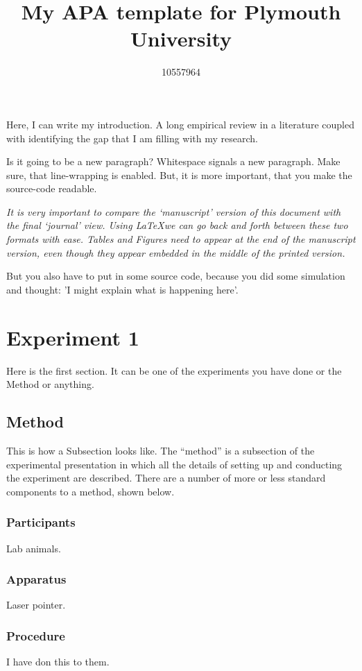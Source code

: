 \documentclass[jou]{apa6} %
\title{My APA template for Plymouth University}
\author{10557964}
\affiliation{School of Psychology \\ Plymouth University}
\begin{document}
\maketitle

Here, I can write my introduction. A long empirical review in a literature coupled with identifying the gap that I am filling with my research.

Is it going to be a new paragraph?
Whitespace signals a new paragraph. Make sure, that line-wrapping is enabled. But,
it is more important, that you make the source-code readable.

\emph{It is very important to compare the `manuscript' version of this document with the final `journal' view.  Using \LaTeX we can go back and forth between these two formats with ease.  Tables and Figures need to appear at the end of the manuscript version, even though they appear embedded in the middle of the printed version.  }

But you also have to put in some source code, because you did some simulation and thought: 'I might explain what is happening here'.

\section{Experiment 1}

Here is the first section. It can be one of the experiments you have done or the Method or anything.
\subsection{Method}

This is how a Subsection looks like.
The ``method'' is a subsection of the experimental presentation in which all the details of setting up and conducting the experiment are described.  There are a number of more or less standard components to a method, shown below.  %

%
\subsubsection{Participants}
Lab animals.
\subsubsection{Apparatus}
Laser pointer.
\subsubsection{Procedure}
I have don this to them.
\end{document}
